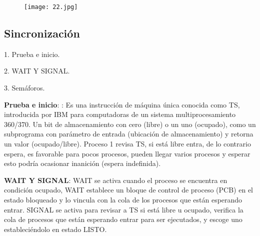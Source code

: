 \begin{figure}[h!]
		\centering
		{\texttt{[image: 22.jpg]}\par} \vspace{1cm}
\end{figure}


\begin{center}
\subsection{Sincronización}
\end{center}

1. Prueba e inicio.

2. WAIT Y SIGNAL.

3. Semáforos.

\textbf{Prueba e inicio}: : Es una instrucción de máquina única conocida como TS, introducida por IBM para computadoras de un sistema multiprocesamiento 360/370.\hfill \break
Un bit de almacenamiento con cero (libre) o un uno (ocupado), como un subprograma con parámetro de entrada (ubicación de almacenamiento) y retorna un valor (ocupado/libre).\hfill \break
Proceso 1 revisa TS, si está libre entra, de lo contrario espera, es favorable para pocos procesos, pueden llegar varios procesos y esperar esto podría ocasionar inanición (espera indefinida).\hfill \break


\textbf{WAIT Y SIGNAL}: WAIT se activa cuando el proceso se encuentra en condición ocupado, WAIT establece un bloque de control de proceso (PCB) en el estado bloqueado y lo vincula con la cola de los procesos que están esperando entrar.\hfill \break
SIGNAL se activa para revisar a TS si está libre u ocupado, verifica la cola de procesos que están esperando entrar para ser ejecutados, y escoge uno estableciéndolo en estado LISTO.\hfill \break


